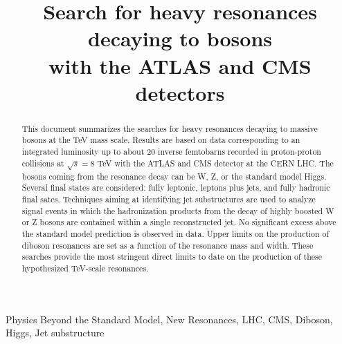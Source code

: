 \documentclass[3p,times,twocolumn]{elsarticle}
\begin{document}
\begin{frontmatter}



\dochead{}

\title{Search for heavy resonances decaying to bosons\\ with the ATLAS and CMS detectors}


\author{}

\address{}

\begin{abstract}
This document summarizes the searches for heavy resonances decaying to
massive bosons at the TeV mass scale. Results are based on data corresponding to an integrated luminosity
up to about 20 inverse femtobarns recorded in proton-proton collisions at
$\sqrt{s} = 8$ TeV with the ATLAS and CMS detector at the CERN LHC. 
The bosons coming from the resonance decay can be W, Z, 
or the standard model Higgs. Several final states are
considered: fully leptonic, leptons plus jets, 
and fully hadronic final sates. Techniques aiming at identifying jet
substructures are used to analyze signal events in which the
hadronization products from the decay of highly boosted W or Z 
bosons are contained within a single reconstructed jet. 
No significant excess above the standard model prediction is observed
in data. Upper limits on the production of diboson resonances are 
set as a function of the resonance mass and width. 
These searches provide the most stringent direct limits to date on the production of these
hypothesized TeV-scale resonances. 
\end{abstract}

\begin{keyword}
Physics Beyond the Standard Model, New Resonances, LHC, CMS, Diboson, Higgs, Jet substructure
\end{keyword}

\end{frontmatter}
\end{document}
